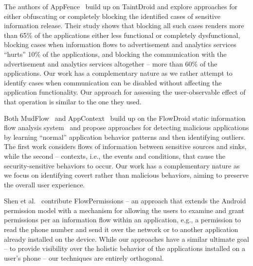The authors of AppFence~\cite{Hornyack:Han:Jung:Schechter:Wetherall:CCS11} build up on TaintDroid and explore approaches for either obfuscating or completely blocking the identified cases of sensitive information release.
Their study shows that blocking all such cases renders more than 65\% of the applications either less functional or completely dysfunctional, blocking cases when information flows to advertisement and analytics services ``hurts'' 10\% of the applications, and blocking the communication with the advertisement and analytics services altogether -- more than 60\% of the applications.
Our work has a complementary nature as we rather attempt to identify cases when communication can be disabled without affecting the application functionality. 
Our approach for assessing the user-observable effect of that operation is similar to the one they used. 

Both MudFlow~\cite{Avdiienko:Kuznetsov:Gorla:Zeller:Arzt:Rasthofer:Bodden:ICSE15} and AppContext~\cite{Yang:Xiao:Andow:Li:Xie:Enck:ICSE15} build up on the FlowDroid static information flow analysis system~\cite{Arzt:Rasthofer:Fritz:Bodden:Bartel:Klein:Traon:Octeau:McDaniel:PLDI14} and propose approaches 
for detecting malicious applications by learning ``normal'' application behavior patterns and then identifying outliers. 
The first work considers flows of information between sensitive sources and sinks, while the second  -- contexts, i.e., the events and conditions, that cause the security-sensitive behaviors to occur. 
Our work has a complementary nature as we focus on identifying covert rather than malicious behaviors, aiming to preserve the overall user experience. 

Shen et al.~\cite{Shen:Vishnubhotla:Todarka:Arora:Dhandapani:Lehner:Ko:Ziarek:ASE14} contribute FlowPermissions -- 
an approach that extends the Android permission model with a mechanism for allowing the users to examine and grant permissions per an information flow within an application, e.g., a permission to read
the phone number and send it over the network or to another application already installed on the device. 
While our approaches have a similar ultimate goal -- to provide visibility over the holistic behavior of the applications installed on a user's phone -- our techniques are entirely orthogonal. 


